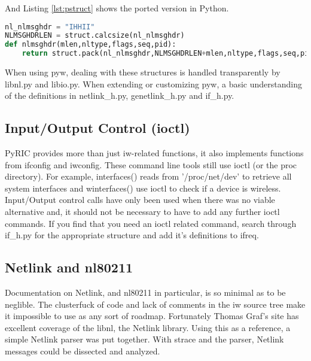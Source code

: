 \documentclass[11pt]{article}
\begin{document}
And Listing \ref{lst:pstruct} shows the ported version in Python.

\begin{lstlisting}[caption={Corresponding Python Definition},
                   label={lst:pstruct},
                   language=Python]
nl_nlmsghdr = "IHHII"
NLMSGHDRLEN = struct.calcsize(nl_nlmsghdr)
def nlmsghdr(mlen,nltype,flags,seq,pid):
    return struct.pack(nl_nlmsghdr,NLMSGHDRLEN+mlen,nltype,flags,seq,pid)
\end{lstlisting}

When using pyw, dealing with these structures is handled transparently by libnl.py 
and libio.py. When extending or customizing pyw, a basic understanding of the 
definitions in netlink\_h.py, genetlink\_h.py and if\_h.py.

\subsection{Input/Output Control (ioctl)}
PyRIC provides more than just iw-related functions, it also implements functions
from ifconfig and iwconfig. These command line tools still use ioctl (or the proc
directory). For example, interfaces() reads from '/proc/net/dev' to retrieve all
system interfaces and winterfaces() use ioctl to check if a device is wireless.
Input/Output control calls have only been used when there was no viable alternative 
and, it should not be necessary to have to add any further ioctl commands. If you
find that you need an ioctl related command, search through if\_h.py for the 
appropriate structure and add it's definitions to ifreq. 

\subsection{Netlink and nl80211}
Documentation on Netlink, and nl80211 in particular, is so minimal as to be 
neglible. The clusterfuck of code and lack of comments in the iw source tree 
make it impossible to use as any sort of roadmap. Fortunately Thomas Graf's 
site\cite{libnl} has excellent coverage of the libnl, the Netlink library.
Using this as a reference, a simple Netlink parser was put together. With 
strace and the parser, Netlink messages could be dissected and analyzed. \\
\end{document}
